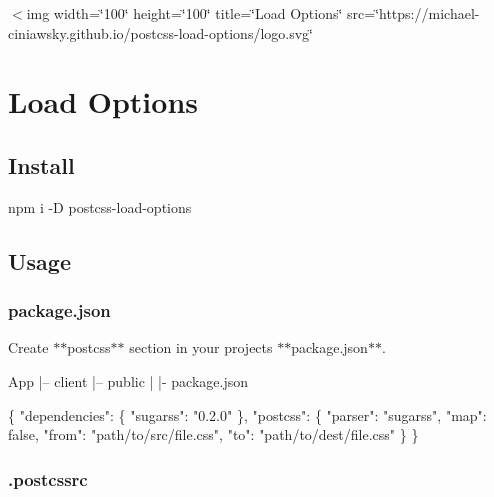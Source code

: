 \href{https://npmjs.com/package/postcss-load-options}{\tt } \href{https://nodejs.org/}{\tt } \href{https://david-dm.org/michael-ciniawsky/postcss-load-options}{\tt } \href{https://travis-ci.org/michael-ciniawsky/postcss-load-options}{\tt } \href{https://coveralls.io/github/michael-ciniawsky/postcss-load-options}{\tt } \href{http://standardjs.com/}{\tt } \href{https://gitter.im/postcss/postcss}{\tt }

 $<$img width=\char`\"{}100\char`\"{} height=\char`\"{}100\char`\"{} title=\char`\"{}\+Load Options\char`\"{} src=\char`\"{}https\+://michael-\/ciniawsky.\+github.\+io/postcss-\/load-\/options/logo.\+svg\char`\"{} \href{https://github.com/postcss/postcss}{\tt } \section*{Load Options}

 

\subsection*{Install}


\begin{DoxyCode}
npm i -D postcss-load-options
\end{DoxyCode}
 \subsection*{Usage}

\subsubsection*{{\ttfamily package.\+json}}

Create $\ast$$\ast${\ttfamily postcss}$\ast$$\ast$ section in your projects $\ast$$\ast${\ttfamily package.\+json}$\ast$$\ast$.


\begin{DoxyCode}
App
  |– client
  |– public
  |
  |- package.json
\end{DoxyCode}



\begin{DoxyCode}
\{
  "dependencies": \{
    "sugarss": "0.2.0"
  \},
  "postcss": \{
    "parser": "sugarss",
    "map": false,
    "from": "path/to/src/file.css",
    "to": "path/to/dest/file.css"
  \}
\}
\end{DoxyCode}


\subsubsection*{{\ttfamily .postcssrc}}

